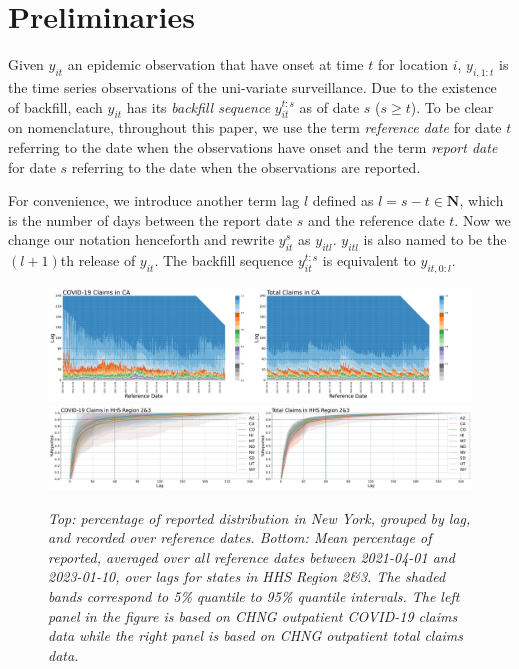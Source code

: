 
\section{Preliminaries}
Given $y_{it}$ an epidemic observation that have onset at time $t$ for location $i$, $y_{i,1:t}$ is the time series observations of the uni-variate surveillance. Due to the existence of backfill, each $y_{it}$ has its \textit{backfill sequence}\cite{kamarthi2021back2future} $y_{it}^{t:s}$ as of date $s$ ($s \geq t$). To be clear on nomenclature, throughout this paper, we use the term \textit{reference date} for date $t$ referring to the date when the observations have onset and the term \textit{report date} for date $s$ referring to the date when the observations are reported. 

For convenience, we introduce another term lag $l$ defined as $l = s-t \in \mathbf{N}$, which is the number of days between the report date $s$ and the reference date $t$. Now we change our notation henceforth and rewrite $y_{it}^s$ as $y_{itl}$. $y_{itl}$ is also named to be the $(l+1)$th release of $y_{it}$. The backfill sequence $y_{it}^{t:s}$ is equivalent to $y_{it,0:l}$. 



\begin{figure}
    \centering
    \includegraphics[width=\textwidth]{figs/completeness_CA.pdf}
    \includegraphics[width=\textwidth]{figs/completeness_lineplot_hhs8&9.pdf}
    \caption{\textit{Top: percentage of reported distribution in New York, grouped by lag, and recorded over reference dates. Bottom: Mean percentage of reported, averaged over all reference dates between 2021-04-01 and 2023-01-10, over lags for states in HHS Region 2\&3. The shaded bands correspond to 5\% quantile to 95\% quantile intervals. The left panel in the figure is based on CHNG outpatient COVID-19 claims data while the right panel is based on CHNG outpatient total claims data.}}
\end{figure}

